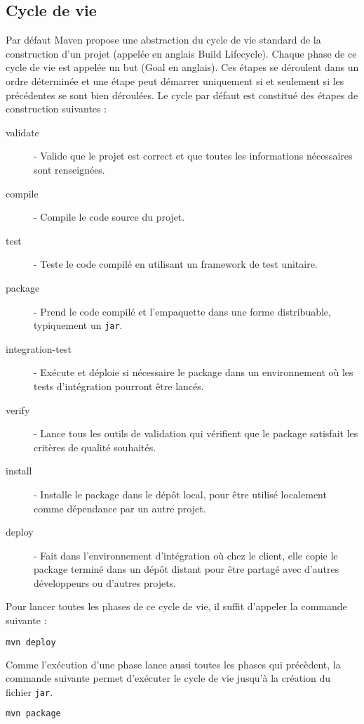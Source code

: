 \documentclass[a4paper,11pt]{article}
\begin{document}
\subsection{Cycle de vie}
Par défaut Maven propose une abstraction du cycle de vie standard de la construction d'un projet (appelée en anglais Build Lifecycle). 
Chaque phase de ce cycle de vie est appelée un but (Goal en anglais). Ces étapes se déroulent dans un ordre déterminée et 
une étape peut démarrer uniquement si et seulement si les précédentes se sont bien déroulées. Le cycle par défaut est constitué 
des étapes de construction suivantes :
\begin{description}
  \item[validate] - Valide que le projet est correct et que toutes les informations nécessaires sont renseignées.
  \item[compile] - Compile le code source du projet.
  \item[test] - Teste le code compilé en utilisant un framework de test unitaire.
  \item[package] - Prend le code compilé et l'empaquette dans une forme distribuable, typiquement un \texttt{jar}.
  \item[integration-test] - Exécute et déploie si nécessaire le package dans un environnement où les tests d'intégration pourront être lancés.
  \item[verify] - Lance tous les outils de validation qui  vérifient que le package satisfait les critères de qualité souhaités.
  \item[install] - Installe le package dans le dépôt local, pour être utilisé localement comme dépendance par un autre projet.
  \item[deploy] - Fait dans l'environnement d'intégration où chez le client, elle copie le package terminé dans un dépôt distant 
  pour être partagé avec d'autres développeurs ou d'autres projets.
\end{description}
Pour lancer toutes les phases de ce cycle de vie, il suffit d'appeler la commande suivante : 
\begin{lstlisting}[language=sh]
mvn deploy
\end{lstlisting}

Comme l'exécution d'une phase lance aussi toutes les phases qui précèdent, la commande suivante permet d'exécuter le cycle 
de vie jusqu'à la création du fichier \texttt{jar}.
\begin{lstlisting}[language=sh]
mvn package
\end{lstlisting}
\end{document}
